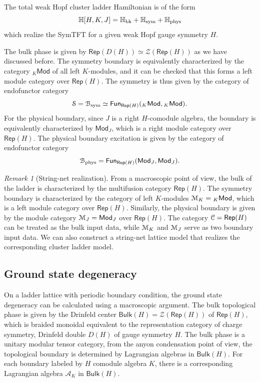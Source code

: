 \documentclass[a4paper,11pt]{article}
\theoremstyle{theorem}
\theoremstyle{remark}
\newtheorem{remark}{Remark}[section]
\newcommand\eB           {\EuScript{B}}
\newcommand\eC           {\EuScript{C}}
\newcommand\eM          {\EuScript{M}}
\newcommand\eS         {\EuScript{S}}
\newcommand{\Rep}{\mathsf{Rep}}
\newcommand{\Mod}{\mathsf{Mod}}
\newcommand{\Fun}{\mathsf{Fun}}
\begin{document}
The total weak Hopf cluster ladder Hamiltonian is of the form
\begin{equation}\label{eq:clusterLadderHam}
    \mathbb{H}[H,K,J]=\mathbb{H}_{\rm bk}+\mathbb{H}_{\rm sym} + \mathbb{H}_{\rm phys} 
\end{equation}
which realize the SymTFT for a given weak Hopf gauge symmetry $H$. 


The bulk phase is given by \( \Rep(D(H)) \simeq \mathcal{Z}(\Rep(H)) \) as we have discussed before. The symmetry boundary is equivalently characterized by the category \( {_{K}\Mod} \) of all left \( K \)-modules, and it can be checked that this forms a left module category over \( \Rep(H) \).
The symmetry is thus given by the category of endofunctor category
\begin{equation}
    \eS =\eB_{\rm sym} \simeq \Fun_{\Rep(H)}({_{K}\Mod}, {_{K}\Mod}). 
\end{equation}
For the physical boundary, since \( J \) is a right \( H \)-comodule algebra, the boundary is equivalently characterized by \( \Mod_{J} \), which is a right module category over \( \Rep(H) \). The physical boundary excitation is given by  the category of endofunctor category
\begin{equation}
    \eB_{\rm phys} = \Fun_{\Rep(H)}(\Mod_{J}, \Mod_{J}).
\end{equation}



\begin{remark}[String-net realization]
  From a macroscopic point of view, the bulk of the ladder is characterized by the multifusion category \( \Rep(H) \). The symmetry boundary is characterized by the category of left \( K \)-modules \( \eM_K = {_K}\mathsf{Mod} \), which is a left module category over \( \Rep(H) \). Similarly, the physical boundary is given by the module category \( \eM_J = \Mod_J \) over \( \Rep(H) \). The category \( \eC = \Rep(H) \) can be treated as the bulk input data, while \( \eM_K \) and \( \eM_J \) serve as two boundary input data. We can also construct a string-net lattice model that realizes the corresponding cluster ladder model.
\end{remark}



\subsection{Ground state degeneracy}

On a ladder lattice with periodic boundary condition, the ground state degeneracy can be calculated using a macroscopic argument. 
The bulk topological phase is given by the Drinfeld center $\mathsf{Bulk}(H)=\mathcal{Z}(\Rep(H))$ of $\Rep(H)$, which is braided monoidal equivalent to the representation category of charge symmetry, Drinfeld double $D(H)$ of gauge symmetry $H$.
The bulk phase is a unitary modular tensor category, from the anyon condensation point of view, the topological boundary is determined by Lagrangian algebras in $\mathsf{Bulk}(H)$.
For each boundary labeled by $H$ comodule algebra $K$, there is a corresponding Lagrangian algebra $\mathcal{A}_K$ in $\mathsf{Bulk}(H)$.
\end{document}
